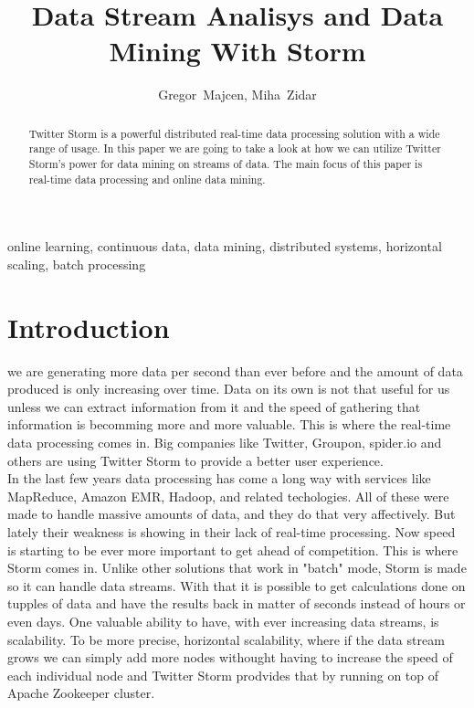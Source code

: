 \documentclass[journal]{IEEEtran/IEEEtran}
\begin{document}
\title{Data Stream Analisys and Data Mining With Storm}

\author{Gregor~Majcen, Miha~Zidar}%
\maketitle
\begin{abstract}
    Twitter Storm is a powerful distributed real-time data processing solution with a wide range of usage. In this paper we are going to take a look at how we can utilize Twitter Storm's power for data mining on streams of data. The main focus of this paper is real-time data processing and online data mining.
\end{abstract}

\begin{IEEEkeywords}
    online learning, continuous data, data mining, distributed systems, horizontal scaling, batch processing
\end{IEEEkeywords}

\IEEEpeerreviewmaketitle


\section{Introduction}
 we are generating more data per second than ever before and the amount of data produced is only increasing over time. Data on its own is not that useful for us unless we can extract information from it and the speed of gathering that information is becomming more and more valuable. This is where the real-time data processing comes in. Big companies like Twitter, Groupon, spider.io and others are using Twitter Storm to provide a better user experience.\\

In the last few years data processing has come a long way with services like MapReduce, Amazon EMR, Hadoop, and related techologies. All of these were made to handle massive amounts of data, and they do that very affectively. But lately their weakness is showing in their lack of real-time processing. Now speed is starting to be ever more important to get ahead of competition. This is where Storm comes in. Unlike other solutions that work in "batch" mode, Storm is made so it can handle data streams. With that it is possible to get calculations done on tupples of data and have the results back in matter of seconds instead of hours or even days. One valuable ability to have, with ever increasing data streams, is scalability. To be more precise, horizontal scalability, where if the data stream grows we can simply add more nodes withought having to increase the speed of each individual node and Twitter Storm prodvides that by running on top of Apache Zookeeper cluster.
\end{document}
